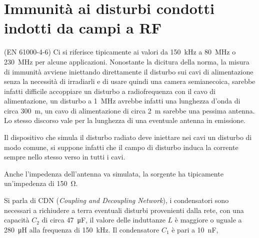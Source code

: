 \section{Immunità ai disturbi condotti indotti da campi a RF} (EN 61000-4-6)
Ci si riferisce tipicamente ai valori da \SI{150}{\kilo\hertz} a \SI{80}{\mega\hertz}
o \SI{230}{\mega\hertz} per alcune applicazioni.
Nonostante la dicitura della norma, la misura di immunità avviene iniettando
direttamente il disturbo sui cavi di alimentazione senza la necessità di irradiarli 
e di usare quindi una camera semianecoica, sarebbe infatti difficile accoppiare un disturbo
a radiofrequenza con il cavo di alimentazione, un disturbo a \SI{1}{\mega\hertz}
avrebbe infatti una lunghezza d'onda di circa \SI{300}{\meter}, un cavo di alimentazione
di circa \SI{2}{\meter} sarebbe una pessima antenna. Lo stesso discorso vale
per la lunghezza di una eventuale antenna in emissione.

Il dispositivo che simula il disturbo radiato deve iniettare nei cavi
un disturbo di modo comune, si suppone infatti che il campo di disturbo
induca la corrente sempre nello stesso verso in tutti i cavi.

Anche l'impedenza dell'antenna va simulata, la sorgente ha tipicamente un'impedenza
di \SI{150}{\ohm}.
\begin{figure}[h]
 \begin{circuitikz}
 \end{circuitikz}
\end{figure}

Si parla di CDN (\textit{Coupling and Decoupling Network}), i condensatori sono necessari a 
richiudere a terra eventuali disturbi provenienti dalla rete, con una
capacità $C_2$ di circa \SI{47}{\micro\farad}, il valore delle induttanze $L$
è maggiore o uguale a \SI{280}{\micro\henry} alla frequenza di \SI{150}{\kilo\hertz}.
Il condensatore $C_1$ è pari a \SI{10}{\nano\farad}, 

